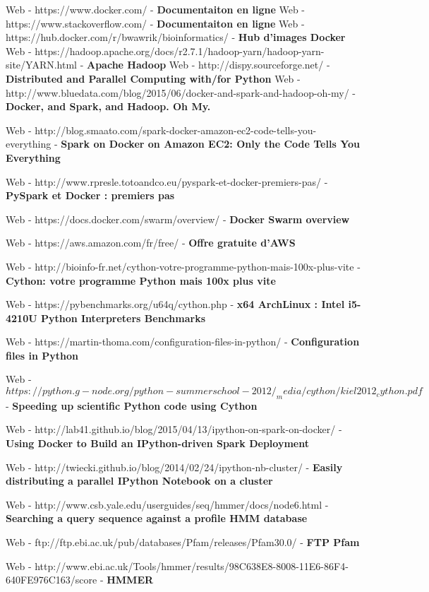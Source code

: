 \cleardoublepage
\begin{thebibliography}{99}

Web - https://www.docker.com/ - \textbf{Documentaiton en ligne}
Web - https://www.stackoverflow.com/ - \textbf{Documentaiton en ligne}
Web - https://hub.docker.com/r/bwawrik/bioinformatics/ - \textbf{Hub d'images Docker}
Web - https://hadoop.apache.org/docs/r2.7.1/hadoop-yarn/hadoop-yarn-site/YARN.html - \textbf{Apache Hadoop}
Web - http://dispy.sourceforge.net/ - \textbf{Distributed and Parallel Computing with/for Python}
Web - http://www.bluedata.com/blog/2015/06/docker-and-spark-and-hadoop-oh-my/ - \textbf{Docker, and Spark, and Hadoop. Oh My.}

Web - http://blog.smaato.com/spark-docker-amazon-ec2-code-tells-you-everything - \textbf{Spark on Docker on Amazon EC2: Only the Code Tells You Everything}

Web - http://www.rpresle.totoandco.eu/pyspark-et-docker-premiers-pas/ - \textbf{PySpark et Docker : premiers pas}


Web - https://docs.docker.com/swarm/overview/ - \textbf{Docker Swarm overview}


Web - https://aws.amazon.com/fr/free/ - \textbf{Offre gratuite d'AWS}


Web - http://bioinfo-fr.net/cython-votre-programme-python-mais-100x-plus-vite - \textbf{Cython: votre programme Python mais 100x plus vite}


Web - https://pybenchmarks.org/u64q/cython.php - \textbf{x64 ArchLinux : Intel i5-4210U Python Interpreters Benchmarks}


Web - https://martin-thoma.com/configuration-files-in-python/ - \textbf{Configuration files in Python}

Web - $https://python.g-node.org/python-summerschool-2012/_media/cython/kiel2012_cython.pdf$ - \textbf{Speeding up scientific Python code using
Cython}

Web - http://lab41.github.io/blog/2015/04/13/ipython-on-spark-on-docker/ - \textbf{Using Docker to Build an IPython-driven Spark Deployment}

Web - http://twiecki.github.io/blog/2014/02/24/ipython-nb-cluster/ - \textbf{Easily distributing a parallel IPython Notebook on a cluster}

Web - http://www.csb.yale.edu/userguides/seq/hmmer/docs/node6.html - \textbf{Searching a query sequence against a profile HMM database}

Web - ftp://ftp.ebi.ac.uk/pub/databases/Pfam/releases/Pfam30.0/ - \textbf{FTP Pfam}

Web - http://www.ebi.ac.uk/Tools/hmmer/results/98C638E8-8008-11E6-86F4-640FE976C163/score - \textbf{HMMER}


\end{thebibliography}